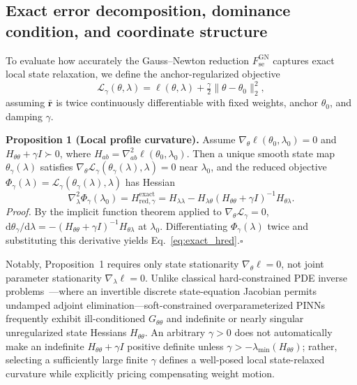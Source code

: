 \documentclass[preprint,11pt]{elsarticle}
\newcommand{\rbar}{\bar{\bm r}}
\newcommand{\Fse}{F_{\mathrm{se}}^{\mathrm{GN}}}
\newcommand{\Hred}{H_{\mathrm{red},\gamma}^{\mathrm{exact}}}
\begin{document}
\subsection{Exact error decomposition, dominance condition, and coordinate structure}
\label{sec:exact_reference}

To evaluate how accurately the Gauss--Newton reduction $\Fse$ captures exact local state relaxation, we define the anchor-regularized objective
\begin{equation}
 \mathcal L_\gamma(\theta,\lambda)=\ell(\theta,\lambda)+\tfrac\gamma2\|\theta-\theta_0\|_2^2,
 \label{eq:gamma_objective}
\end{equation}
assuming $\rbar$ is twice continuously differentiable with fixed weights, anchor $\theta_0$, and damping $\gamma$.

\medskip\noindent\textbf{Proposition 1 (Local profile curvature).}
Assume $\nabla_\theta\ell(\theta_0,\lambda_0)=0$ and $H_{\theta\theta}+\gamma I\succ 0$, where $H_{ab}=\nabla^2_{ab}\ell(\theta_0,\lambda_0)$.
Then a unique smooth state map $\theta_\gamma(\lambda)$ satisfies $\nabla_\theta\mathcal L_\gamma(\theta_\gamma(\lambda),\lambda)=0$ near $\lambda_0$, and the reduced objective $\Phi_\gamma(\lambda)=\mathcal L_\gamma(\theta_\gamma(\lambda),\lambda)$ has Hessian
\begin{equation}
 \nabla_\lambda^2\Phi_\gamma(\lambda_0)
 =\Hred
 =H_{\lambda\lambda}-H_{\lambda\theta}(H_{\theta\theta}+\gamma I)^{-1}H_{\theta\lambda}.
 \label{eq:exact_hred}
\end{equation}
\emph{Proof.}
By the implicit function theorem applied to $\nabla_\theta\mathcal L_\gamma=0$, $\mathrm d\theta_\gamma/\mathrm d\lambda=-(H_{\theta\theta}+\gamma I)^{-1}H_{\theta\lambda}$ at $\lambda_0$.
Differentiating $\Phi_\gamma(\lambda)$ twice and substituting this derivative yields Eq.~\eqref{eq:exact_hred}.\hfill$\square$

Notably, Proposition~1 requires only state stationarity $\nabla_\theta\ell=0$, not joint parameter stationarity $\nabla_\lambda\ell=0$.
Unlike classical hard-constrained PDE inverse problems~\cite{biros2005parallel,buithanh2013computational}---where an invertible discrete state-equation Jacobian permits undamped adjoint elimination---soft-constrained overparameterized PINNs frequently exhibit ill-conditioned $G_{\theta\theta}$ and indefinite or nearly singular unregularized state Hessians $H_{\theta\theta}$.
An arbitrary $\gamma>0$ does not automatically make an indefinite $H_{\theta\theta}+\gamma I$ positive definite unless $\gamma>-\lambda_{\min}(H_{\theta\theta})$; rather, selecting a sufficiently large finite $\gamma$ defines a well-posed local state-relaxed curvature while explicitly pricing compensating weight motion.
\end{document}
